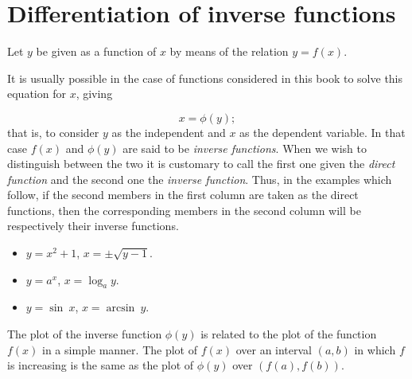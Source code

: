 \section{Differentiation of inverse functions}

Let $y$ be given as a function of $x$ by means of the relation $y = f(x)$.

It is usually possible in the case of functions considered in this book 
to solve this equation for $x$, giving

\[
    x = \phi (y);
\]
that is, to consider $y$ as the independent and $x$ as the dependent variable. 
In that case $f(x)$ and $\phi (y)$ are said to be {\it inverse functions}. 
When we wish to distinguish between the two it is customary to call the 
first one given the {\it direct function} and the second one the 
{\it inverse function}. Thus, in the examples which follow, if the 
second members in the first column are taken as the direct functions, 
then the corresponding members in the second column will be respectively their inverse functions.

\begin{example}
{\rm
\begin{itemize}
\item   
$y=x^2 + 1$, 	$x = \pm \sqrt{y - 1}$.
\item
 $y = a^x$, 	$x = \log_a y$.

\item
$ y = \sin\ x$, $x = \arcsin\ y$.
\end{itemize}
}
\end{example}

The plot of the inverse function $\phi(y)$ is related to the plot of the function
$f(x)$ in a simple manner. The plot of $f(x)$ over an interval $(a,b)$ in which $f$ is 
increasing is the same as the plot of $\phi(y)$ over $(f(a),f(b))$. 

